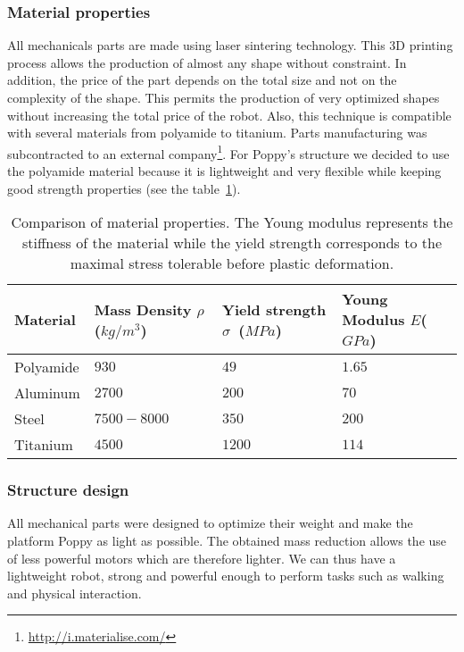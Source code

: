 \subsubsection{Material properties} %
\label{ssub:material_properties}

All mechanicals parts are made using laser sintering technology. This 3D printing process allows the production of almost any shape without constraint. In addition, the price of the part depends on the total size and not on the complexity of the shape. This permits the production of very optimized shapes without increasing the total price of the robot. Also, this technique is compatible with several materials from polyamide to titanium. Parts manufacturing was subcontracted to an external company\footnote{\url{http://i.materialise.com/}}.
For Poppy's structure we decided to use the polyamide material because it is lightweight and very flexible while keeping good strength properties (see the table~\ref{tab:materials}).

\begin{table}[h]
    \centering
    \begin{tabularx}{0.8\linewidth }{l X X X}
        Material & Mass Density $\rho$ ($kg/m^3$) &  Yield strength $\sigma$~($MPa$) & Young Modulus $E$($GPa$)\\
        \hline
        Polyamide & $930$ & $49$ & $1.65$\\

        Aluminum & $2700$ & $200$ & $70$\\

        Steel & $7500-8000$ & $350$ & $200$\\

        Titanium & $4500$ & $1200$ & $114$\\

    \end{tabularx}

    \caption{Comparison of material properties.
    The Young modulus represents the stiffness of the material while the yield strength corresponds to the maximal stress tolerable before plastic deformation.}
    \label{tab:materials}
\end{table}


\subsubsection{Structure design} %
\label{ssub:structure_design}

All mechanical parts were designed to optimize their weight and make the platform Poppy as light as possible.
The obtained mass reduction allows the use of less powerful motors which are therefore lighter.
We can thus have a lightweight robot, strong and powerful enough to perform tasks such as walking and physical interaction.

